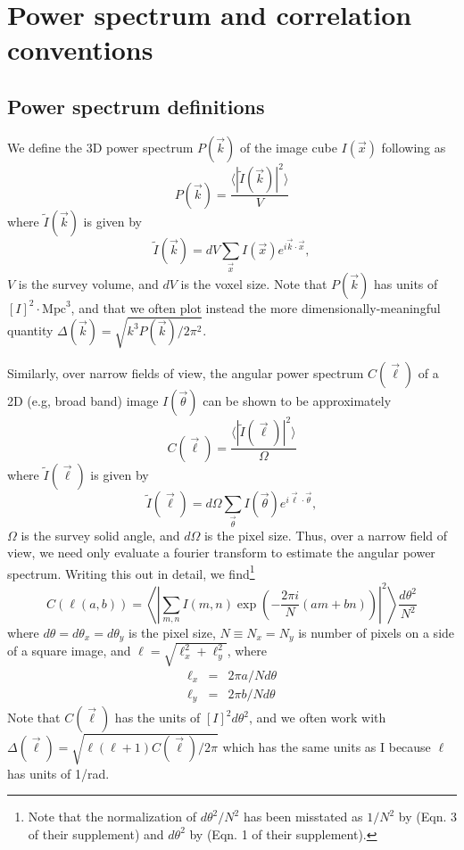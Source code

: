 \documentclass{emulateapj}
\begin{document}
\section{Power spectrum and correlation conventions}
\label{sec:pspecconventions}

\subsection{Power spectrum definitions}

We define the 3D power spectrum $P(\vec{k})$ of the image cube $I(\vec{x})$ following \citet{ewallwice14} as 
\begin{equation}
\label{eqn:pspec3Ddef}
	P(\vec{k}) = \frac{\langle|\tilde{I}(\vec{k})|^2\rangle}{V}
\end{equation}
where $\tilde{I}(\vec{k})$ is given by
\begin{equation}
	\tilde{I}(\vec{k})=dV\sum_{\vec{x}}I(\vec{x})e^{i\vec{k}\cdot\vec{x}},
\end{equation}
$V$ is the survey volume, and $dV$ is the voxel size. Note that $P(\vec{k})$ has units of $[I]^2\cdot\text{Mpc}^3$, and that we often plot instead the more dimensionally-meaningful quantity $\Delta(\vec{k})=\sqrt{k^3P(\vec{k})/2\pi^2}$.

Similarly, over narrow fields of view, the angular power spectrum $C(\vec{\ell})$ of a 2D (e.g, broad band) image $I(\vec{\theta})$ can be shown to be approximately
\begin{equation}
\label{eqn:Cldef0}
	C(\vec{\ell}) = \frac{\langle|\tilde{I}(\vec{\ell})|^2\rangle}{\Omega} 
\end{equation}
where $\tilde{I}(\vec{\ell})$ is given by
\begin{equation}
	\tilde{I}(\vec{\ell})=d\Omega\sum_{\vec{\theta}}I(\vec{\theta})e^{i\vec{\ell}\cdot\vec{\theta}},
\end{equation}
$\Omega$ is the survey solid angle, and $d\Omega$ is the pixel size. Thus, over a narrow field of view, we need only evaluate a fourier transform to estimate the angular power spectrum. Writing this out in detail, we find\footnote{Note that the normalization of $d\theta^2/N^2$ has been misstated as $1/N^2$ by \citet{zemcov14} (Eqn. 3 of their supplement) and $d\theta^2$ by \citet{cooray12} (Eqn. 1 of their supplement).} 
\begin{equation}
\label{eqn:Cldef}
	C(\ell(a,b))=\left\langle\left|\sum_{m,n}I(m,n)\exp\left(-\frac{2\pi i}{N}  (am+bn)\right)\right|^2\right\rangle\frac{d\theta^2}{N^2}
\end{equation}
where $d\theta=d\theta_x=d\theta_y$ is the pixel size, $N\equiv N_x=N_y$ is number of pixels on a side of a square image, and $\ell=\sqrt{\ell_x^2+\ell_y^2}$, where 
\begin{eqnarray}
\ell_x&=&2\pi a/N d\theta \label{eqn:elldef}\\
\ell_y&=&2\pi b/Nd\theta \label{eqn:elldef2}
\end{eqnarray}
Note that $C(\vec{\ell})$ has the units of $[I]^2d\theta^2$, and we often work with $\Delta(\vec{\ell})=\sqrt{\ell(\ell+1)C(\vec{\ell})/2\pi}$ which has the same units as I because $\ell$ has units of 1/rad. 
\end{document}
